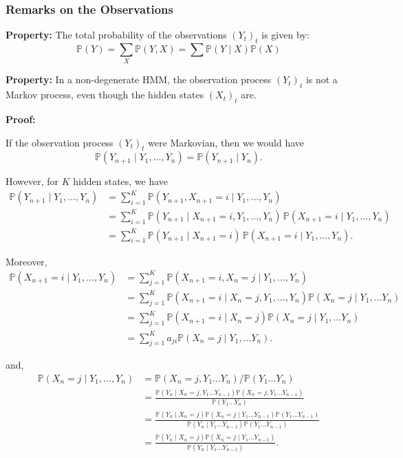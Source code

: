 \documentclass[11pt]{article}
\begin{document}
\newpage



\subsubsection{Remarks on the Observations}

\textbf{Property:}
The total probability of the observations $(Y_t)_{t}$ is given by: 
\[
\mathbb{P}(Y) = \sum_{X}\mathbb{P}(Y,X) = \sum_{}\mathbb{P}(Y \mid X)\mathbb{P}(X)
\]
\vspace{0.3cm}

\textbf{Property:}
In a non-degenerate HMM, the observation process $(Y_t)_{t}$ is not a Markov process, even though the hidden states $(X_t)_{t}$ are. 

\textbf{Proof:}

If the observation process $(Y_t)_{t}$ were Markovian, then we would have
\[
\mathbb{P}(Y_{n+1} \mid Y_1,\dots,Y_n) = \mathbb{P}(Y_{n+1} \mid Y_n).
\]

However, for $K$ hidden states, we have
\begin{align*}
\mathbb{P}(Y_{n+1} \mid Y_1,\dots,Y_n)
&= \sum_{i=1}^{K} \mathbb{P}(Y_{n+1}, X_{n+1}=i \mid Y_1,\dots,Y_n) \\
&= \sum_{i=1}^{K} \mathbb{P}(Y_{n+1} \mid X_{n+1}=i, Y_1,\dots,Y_n)\,
\mathbb{P}(X_{n+1}=i \mid Y_1,\dots,Y_n) \\
&= \sum_{i=1}^{K} \mathbb{P}(Y_{n+1} \mid X_{n+1}=i)\,
\mathbb{P}(X_{n+1}=i \mid Y_1,\dots,Y_n).
\end{align*}

Moreover, 
\begin{align*}
\mathbb{P}(X_{n+1}=i \mid Y_1,\dots,Y_n)
&= \sum_{j=1}^{K} \mathbb{P}(X_{n+1}=i, X_{n}=j \mid Y_1,\dots,Y_n) \\
&= \sum_{j=1}^{K} \mathbb{P}(X_{n+1}=i \mid X_{n}=j, Y_1,\dots,Y_n) \mathbb{P}(X_{n}=j \mid Y_1, \dots Y_n)\\
&= \sum_{j=1}^{K} \mathbb{P}(X_{n+1}=i \mid X_{n}=j) \mathbb{P}(X_n=j \mid Y_1, \dots Y_n)\\
&= \sum_{j=1}^{K} a_{ji} \mathbb{P}(X_n=j \mid Y_1, \dots Y_n).
\end{align*}

and, 
\begin{align*}
\mathbb{P}(X_{n}=j \mid Y_1,\dots,Y_n) 
&= \mathbb{P}(X_n=j, Y_1 \dots Y_n) / \mathbb{P}(Y_1 \dots Y_n) \\[0.3cm]
&= \frac{\mathbb{P}(Y_n \mid X_n=j,Y_1 \dots Y_{n-1}) \mathbb{P}(X_n=j, Y_1 \dots Y_{n-1})}{\mathbb{P}(Y_1 \dots Y_n)} \\[0.3cm]
&= \frac{\mathbb{P}(Y_n \mid X_n=j) \mathbb{P}(X_n=j \mid Y_1 \dots Y_{n-1}) \mathbb{P}(Y_1 \dots Y_{n-1})}{\mathbb{P}(Y_n \mid Y_1 \dots Y_{n-1}) \mathbb{P}(Y_1 \dots Y_{n-1})}\\[0.3cm]
&= \frac{\mathbb{P}(Y_n \mid X_n=j) \mathbb{P}(X_n=j \mid Y_1 \dots Y_{n-1})}{\mathbb{P}(Y_n \mid Y_1 \dots Y_{n-1})}.
\end{align*}
\end{document}
